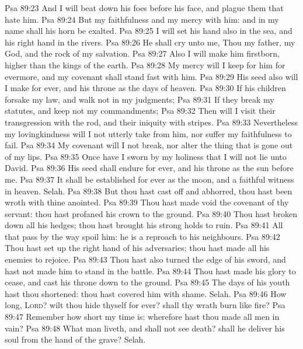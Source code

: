 \vs Psa 89:23 And I will beat down his foes before his face, and plague them that hate him.
\vs Psa 89:24 But my faithfulness and my mercy  with him: and in my name shall his horn be exalted.
\vs Psa 89:25 I will set his hand also in the sea, and his right hand in the rivers.
\vs Psa 89:26 He shall cry unto me, Thou  my father, my God, and the rock of my salvation.
\vs Psa 89:27 Also I will make him  firstborn, higher than the kings of the earth.
\vs Psa 89:28 My mercy will I keep for him for evermore, and my covenant shall stand fast with him.
\vs Psa 89:29 His seed also will I make  for ever, and his throne as the days of heaven.
\vs Psa 89:30 If his children forsake my law, and walk not in my judgments;
\vs Psa 89:31 If they break my statutes, and keep not my commandments;
\vs Psa 89:32 Then will I visit their transgression with the rod, and their iniquity with stripes.
\vs Psa 89:33 Nevertheless my lovingkindness will I not utterly take from him, nor suffer my faithfulness to fail.
\vs Psa 89:34 My covenant will I not break, nor alter the thing that is gone out of my lips.
\vs Psa 89:35 Once have I sworn by my holiness that I will not lie unto David.
\vs Psa 89:36 His seed shall endure for ever, and his throne as the sun before me.
\vs Psa 89:37 It shall be established for ever as the moon, and  a faithful witness in heaven. Selah.
\vs Psa 89:38 But thou hast cast off and abhorred, thou hast been wroth with thine anointed.
\vs Psa 89:39 Thou hast made void the covenant of thy servant: thou hast profaned his crown  to the ground.
\vs Psa 89:40 Thou hast broken down all his hedges; thou hast brought his strong holds to ruin.
\vs Psa 89:41 All that pass by the way spoil him: he is a reproach to his neighbours.
\vs Psa 89:42 Thou hast set up the right hand of his adversaries; thou hast made all his enemies to rejoice.
\vs Psa 89:43 Thou hast also turned the edge of his sword, and hast not made him to stand in the battle.
\vs Psa 89:44 Thou hast made his glory to cease, and cast his throne down to the ground.
\vs Psa 89:45 The days of his youth hast thou shortened: thou hast covered him with shame. Selah.
\vs Psa 89:46 How long, \textsc{Lord}? wilt thou hide thyself for ever? shall thy wrath burn like fire?
\vs Psa 89:47 Remember how short my time is: wherefore hast thou made all men in vain?
\vs Psa 89:48 What man  liveth, and shall not see death? shall he deliver his soul from the hand of the grave? Selah.
